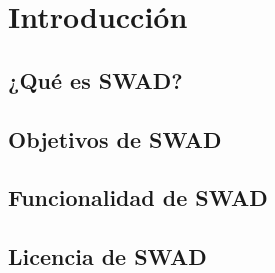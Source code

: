 \chapter{Introducción}
\section{¿Qué es SWAD?}
\section{Objetivos de SWAD}
\section{Funcionalidad de SWAD}
\section{Licencia de SWAD}
